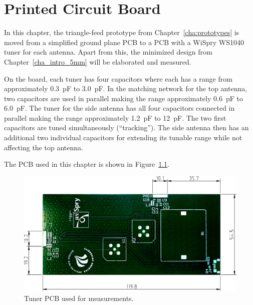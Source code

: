 \chapter{Printed Circuit Board}
\label{cha:pcb}

In this chapter, the triangle-feed prototype from Chapter~\ref{cha:prototypes} is moved from a simplified ground plane PCB to a PCB with a WiSpry WS1040 tuner for each antenna. Apart from this, the minimized design from Chapter~\ref{cha_intro_5mm} will be elaborated and measured.

On the board, each tuner has four capacitors where each has a range from approximately \SI{0.3}{pF} to \SI{3.0}{pF}. In the matching network for the top antenna, two capacitors are used in parallel making the range approximately \SI{0.6}{pF} to \SI{6.0}{pF}. The tuner for the side antenna has all four capacitors connected in parallel making the range approximately \SI{1.2}{pF} to \SI{12}{pF}. The two first capacitors are tuned simultaneously (``tracking''). The side antenna then has an additional two individual capacitors for extending its tunable range while not affecting the top antenna.

The PCB used in this chapter is shown in Figure~\ref{fig:samanthas_board}.

\begin{figure}[htbp]
    \centering
    \includegraphics[scale=0.5]{img/tech_sol/samanthas_board.pdf}
    \caption{Tuner PCB used for measurements.}
    \label{fig:samanthas_board}
\end{figure}
